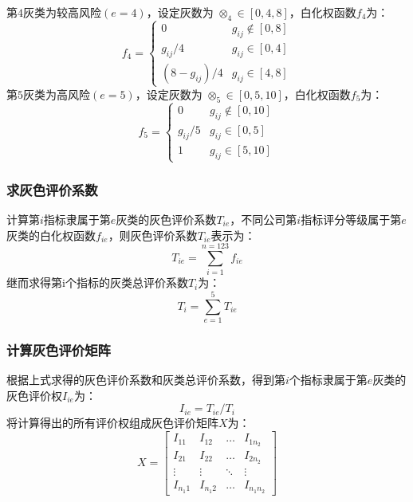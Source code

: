 \documentclass[withoutpreface,bwprint]{cumcmthesis}
\begin{document}
            第$4$灰类为较高风险$(e = 4)$，设定灰数为 $\otimes_{4} \in[0,4,8]$，白化权函数$f_4$为：
            \begin{equation}
                f_{4}=\left\{
                    \begin{array}{cc}
                        0 & g_{i j} \notin[0,8] \\
                        g_{ij} / 4 & g_{i j} \in[0,4] \\
                        (8 - g_{ij}) / 4 & g_{i j} \in[4,8]
                    \end{array}\right.
            \end{equation}
            第$5$灰类为高风险$(e = 5)$，设定灰数为 $\otimes_{5} \in[0,5,10]$，白化权函数$f_5$为：
            \begin{equation}
                f_{5}=\left\{
                    \begin{array}{cc}
                        0 & g_{i j} \notin[0,10] \\
                        g_{ij} / 5 & g_{i j} \in[0,5] \\
                        1 & g_{i j} \in[5,10]
                    \end{array}\right.
            \end{equation}

        \subsubsection{求灰色评价系数}
            计算第$i$指标隶属于第$e$灰类的灰色评价系数$T_{ie}$，不同公司第$i$指标评分等级属于第$e$灰类的白化权函数$f_{ie}$，则灰色评价系数$T_{ie}$表示为：
            \begin{equation}
               T_{ie} = \sum_{i = 1}^{n = 123} f_{ie}
            \end{equation}
            继而求得第i个指标的灰类总评价系数$T_i$为：
            \begin{equation}
                T_i = \sum_{e = 1}^{5} T_{ie}
            \end{equation}
        \subsubsection{计算灰色评价矩阵}
            根据上式求得的灰色评价系数和灰类总评价系数，得到第$i$个指标隶属于第$e$灰类的灰色评价权$I_{ie}$为：
            \begin{equation*}
                I_{ie} = T_{ie} / T_i
            \end{equation*}
            将计算得出的所有评价权组成灰色评价矩阵$X$为：
            \begin{equation}
                X=\left[
                    \begin{array}{cccc}
                    I_{11} & I_{12} & \dots & I_{1 n_2}\\
                    I_{21} & I_{22} & \dots & I_{2 n_2}\\
                    \vdots & \vdots & \ddots & \vdots \\
                    I_{n_1 1} & I_{n_1 2} & \dots & I_{n_1 n_2}
                    \end{array}\right]
            \end{equation}
\end{document}
